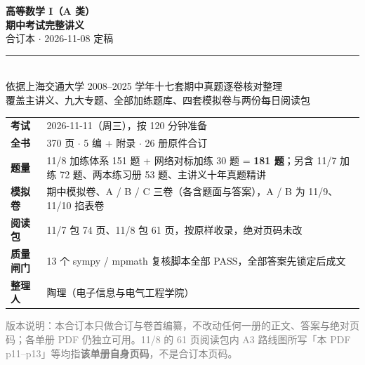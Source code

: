 \documentclass[11pt,a4paper]{ctexart}
\begin{document}
\begin{center}
\vspace*{1.6cm}
{\Huge\bfseries 高等数学 I（A 类）}\\[6pt]
{\Huge\bfseries 期中考试完整讲义}\\[10pt]
{\Large 合订本 $\cdot$ 2026-11-08 定稿}\\[18pt]
\rule{0.82\linewidth}{0.6pt}\\[14pt]
{\large 依据上海交通大学 2008--2025 学年十七套期中真题逐卷核对整理}\\[4pt]
{\large 覆盖主讲义、九大专题、全部加练题库、四套模拟卷与两份每日阅读包}\\[16pt]
\end{center}

\begin{center}
\begin{tabular}{@{}ll@{}}
\textbf{考试} & 2026-11-11（周三），按 120 分钟准备 \\
\textbf{全书} & 370 页 $\cdot$ 5 编 + 附录 $\cdot$ 26 册原件合订 \\
\textbf{题量} & 11/8 加练体系 151 题 + 网络对标加练 30 题 = \textbf{181 题}；另含 11/7 加练 72 题、两本练习册 53 题、主讲义十年真题精讲 \\
\textbf{模拟卷} & 期中模拟卷、A / B / C 三卷（各含题面与答案），A / B 为 11/9、11/10 掐表卷 \\
\textbf{阅读包} & 11/7 包 74 页、11/8 包 61 页，按原样收录，绝对页码未改 \\
\textbf{质量闸门} & 13 个 sympy / mpmath 复核脚本全部 PASS，全部答案先锁定后成文 \\
\textbf{整理人} & 陶理（电子信息与电气工程学院） \\
\end{tabular}
\end{center}

\vspace{0.7cm}
\begin{center}
\end{center}

\vspace{0.6cm}
\noindent\textcolor{gray}{\footnotesize 版本说明：本合订本只做合订与卷首编纂，不改动任何一册的正文、答案与绝对页码；各单册 PDF 仍独立可用。11/8 的 61 页阅读包内 A3 路线图所写「本 PDF p11--p13」等均指\textbf{该单册自身页码}，不是合订本页码。}
\end{document}
